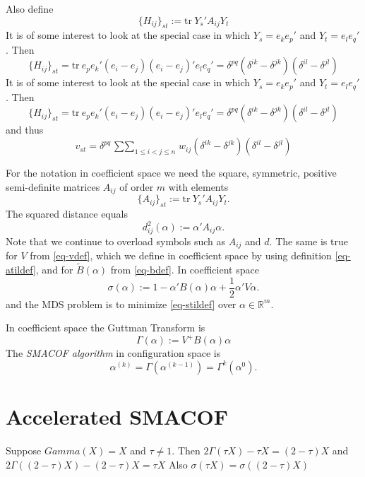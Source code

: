 \documentclass[
  12pt,
  letterpaper,
  DIV=11,
  numbers=noendperiod]{scrartcl}
\begin{document}
Also define \[
  \{H_{ij}\}_{st}:=\text{tr}\ Y_s'A_{ij}Y_t
\] It is of some interest to look at the special case in which
\(Y_s=e_ke_p'\) and \(Y_t=e_le_q'\). Then \[
  \{H_{ij}\}_{st}=\text{tr}\ e_pe_k'(e_i-e_j)(e_i-e_j)'e_le_q'=\delta^{pq}(\delta^{ik}-\delta^{jk})(\delta^{il}-\delta^{jl})
\] It is of some interest to look at the special case in which
\(Y_s=e_ke_p'\) and \(Y_t=e_le_q'\). Then \[
  \{H_{ij}\}_{st}=\text{tr}\ e_pe_k'(e_i-e_j)(e_i-e_j)'e_le_q'=\delta^{pq}(\delta^{ik}-\delta^{jk})(\delta^{il}-\delta^{jl})
\] and thus \[
  v_{st}=\delta^{pq}\mathop{\sum\sum}_{1\leq i<j\leq n}w_{ij}(\delta^{ik}-\delta^{jk})(\delta^{il}-\delta^{jl})
\]

For the notation in coefficient space we need the square, symmetric,
positive semi-definite matrices \(A_{ij}\) of order \(m\) with elements
\begin{equation}
\{A_{ij}\}_{st}:=\text{tr}\ Y_s'A_{ij}Y_t.\label{eq-atildef}
\end{equation} The squared distance equals \begin{equation}
d_{ij}^2(\alpha):=\alpha'A_{ij}\alpha.\label{eq-dtildef}
\end{equation} Note that we continue to overload symbols such as
\(A_{ij}\) and \(d\). The same is true for \(V\) from \eqref{eq-vdef},
which we define in coefficient space by using definition
\eqref{eq-atildef}, and for \(\tilde B(\alpha)\) from \eqref{eq-bdef}.
In coefficient space \begin{equation}
\sigma(\alpha):=
1-\alpha'B(\alpha)\alpha+\frac12\alpha'V\alpha.\label{eq-stildef}
\end{equation} and the MDS problem is to minimize \eqref{eq-stildef}
over \(\alpha\in\mathbb{R}^m\).

In coefficient space the Guttman Transform is \begin{equation}
\Gamma(\alpha):=V^+B(\alpha)\alpha
\label{eq-guttmana}
\end{equation} The \emph{SMACOF algorithm} in configuration space is
\begin{equation}
\alpha^{(k)}=\Gamma(\alpha^{(k-1)})=\Gamma^k(\alpha^{0}).
\label{eq-smacofx}
\end{equation}

\section{Accelerated SMACOF}\label{accelerated-smacof}

Suppose \(Gamma(X)=X\) and \(\tau\neq 1\). Then
\(2\Gamma(\tau X)-\tau X=(2-\tau)X\) and
\(2\Gamma((2-\tau)X)-(2-\tau)X=\tau X\) Also
\(\sigma(\tau X)=\sigma((2-\tau)X)\)
\end{document}
